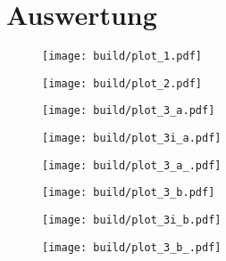 \section{Auswertung}
\label{sec:auswertung}

\begin{figure}[H]
	\centering
	\texttt{[image: build/plot\_1.pdf]}
	\caption{}
	\label{fig:1}
\end{figure}

\begin{figure}[H]
	\centering
	\texttt{[image: build/plot\_2.pdf]}
	\caption{}
	\label{fig:2}
\end{figure}

\begin{figure}[H]
	\centering
	\texttt{[image: build/plot\_3\_a.pdf]}
	\caption{}
	\label{fig:3_a}
\end{figure}

\begin{figure}[H]
	\centering
	\texttt{[image: build/plot\_3i\_a.pdf]}
	\caption{}
	\label{fig:3i_a}
\end{figure}

\begin{figure}[H]
	\centering
	\texttt{[image: build/plot\_3\_a\_.pdf]}
	\caption{}
	\label{fig:3_a_}
\end{figure}

\begin{figure}[H]
	\centering
	\texttt{[image: build/plot\_3\_b.pdf]}
	\caption{}
	\label{fig:3_b}
\end{figure}

\begin{figure}[H]
	\centering
	\texttt{[image: build/plot\_3i\_b.pdf]}
	\caption{}
	\label{fig:3i_b}
\end{figure}

\begin{figure}[H]
	\centering
	\texttt{[image: build/plot\_3\_b\_.pdf]}
	\caption{}
	\label{fig:3_b_}
\end{figure}
